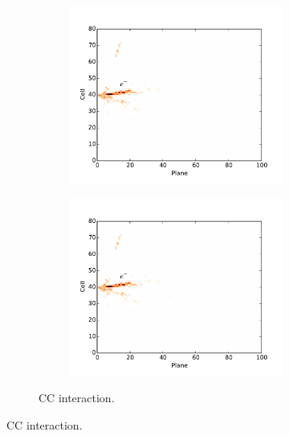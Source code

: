 \begin{figure}[t]
\begin{subfigure}[c]{\textwidth}
\centering
\begin{subfigure}[c]{0.47\textwidth}
\includegraphics[width=\textwidth]{figures/cnn/view_truetype6_caltype6_event155_x.pdf}
\vspace{-20pt}
\caption*{\xview}
\end{subfigure}
\begin{subfigure}[c]{0.47\textwidth}
\includegraphics[width=\textwidth]{figures/cnn/view_truetype6_caltype6_event155_x.pdf}
\vspace{-20pt}
\caption*{\yview}
\end{subfigure}
\vspace{-10pt}
\caption{\nue CC interaction.}
\label{pixnue}
\end{subfigure}


\end{figure}
